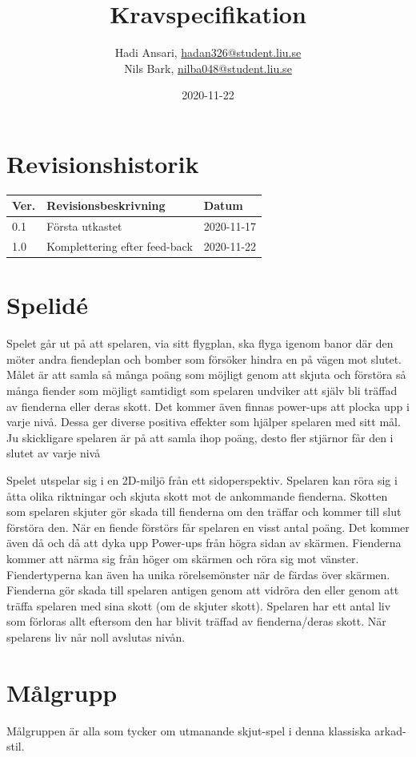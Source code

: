 \documentclass{TDP005mall}
\author{Hadi Ansari, \url{hadan326@student.liu.se}\\
  Nils Bark, \url{nilba048@student.liu.se}}
\title{Kravspecifikation}
\date{2020-11-22}
\begin{document}
\projectpage
\tableofcontents
\thispagestyle{empty}
\cleardoublepage

\section{Revisionshistorik}
\begin{table}[!h]
\begin{tabularx}{\linewidth}{|l|X|l|}
\hline
Ver. & Revisionsbeskrivning & Datum \\\hline
0.1 & Första utkastet & 2020-11-17 \\\hline
1.0 & Komplettering efter feed-back& 2020-11-22 \\\hline

\end{tabularx}
\end{table}


\section{Spelidé}
Spelet går ut på att spelaren, via sitt flygplan, ska flyga igenom banor där den möter andra fiendeplan och bomber som försöker hindra en på vägen mot slutet. 
Målet är att samla så många poäng som möjligt genom att skjuta och förstöra så många fiender som möjligt samtidigt som spelaren undviker att själv bli träffad av fienderna eller deras skott.
Det kommer även finnas power-ups att plocka upp i varje nivå. Dessa ger diverse positiva effekter som hjälper spelaren med sitt mål. Ju skickligare spelaren är på att samla ihop poäng, desto fler stjärnor får den i slutet av varje nivå

Spelet utspelar sig i en 2D-miljö från ett sidoperspektiv. Spelaren kan röra sig i åtta olika
riktningar och skjuta skott mot de ankommande fienderna. Skotten som spelaren skjuter gör
skada till fienderna om den träffar och kommer till slut förstöra den. När en fiende förstörs
får spelaren en visst antal poäng. Det kommer även då och då att dyka upp Power-ups från högra sidan av skärmen. 
Fienderna kommer att närma sig från höger om skärmen och röra sig mot vänster. 
Fiendertyperna kan även ha unika rörelsemönster när de färdas över skärmen. 
Fienderna gör skada till spelaren antigen genom att vidröra den
eller genom att träffa spelaren med sina skott (om de skjuter skott). 
Spelaren har ett antal liv som förloras allt eftersom den har blivit träffad av fienderna/deras skott.
När spelarens liv når noll avslutas nivån.

\section{Målgrupp}
Målgruppen är alla som tycker om utmanande skjut-spel i denna klassiska arkad-stil.
\end{document}
